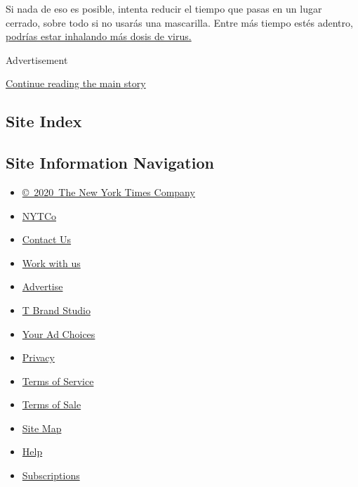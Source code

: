 Si nada de eso es posible, intenta reducir el tiempo que pasas en un
lugar cerrado, sobre todo si no usarás una mascarilla. Entre más tiempo
estés adentro,
\href{https://www.nytimes3xbfgragh.onion/2020/05/29/health/coronavirus-transmission-dose.html}{podrías
estar inhalando más dosis de virus.}

Advertisement

\protect\hyperlink{after-bottom}{Continue reading the main story}

\hypertarget{site-index}{%
\subsection{Site Index}\label{site-index}}

\hypertarget{site-information-navigation}{%
\subsection{Site Information
Navigation}\label{site-information-navigation}}

\begin{itemize}
\tightlist
\item
  \href{https://help.nytimes3xbfgragh.onion/hc/en-us/articles/115014792127-Copyright-notice}{©~2020~The
  New York Times Company}
\end{itemize}

\begin{itemize}
\tightlist
\item
  \href{https://www.nytco.com/}{NYTCo}
\item
  \href{https://help.nytimes3xbfgragh.onion/hc/en-us/articles/115015385887-Contact-Us}{Contact
  Us}
\item
  \href{https://www.nytco.com/careers/}{Work with us}
\item
  \href{https://nytmediakit.com/}{Advertise}
\item
  \href{http://www.tbrandstudio.com/}{T Brand Studio}
\item
  \href{https://www.nytimes3xbfgragh.onion/privacy/cookie-policy\#how-do-i-manage-trackers}{Your
  Ad Choices}
\item
  \href{https://www.nytimes3xbfgragh.onion/privacy}{Privacy}
\item
  \href{https://help.nytimes3xbfgragh.onion/hc/en-us/articles/115014893428-Terms-of-service}{Terms
  of Service}
\item
  \href{https://help.nytimes3xbfgragh.onion/hc/en-us/articles/115014893968-Terms-of-sale}{Terms
  of Sale}
\item
  \href{https://spiderbites.nytimes3xbfgragh.onion}{Site Map}
\item
  \href{https://help.nytimes3xbfgragh.onion/hc/en-us}{Help}
\item
  \href{https://www.nytimes3xbfgragh.onion/subscription?campaignId=37WXW}{Subscriptions}
\end{itemize}
